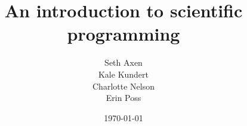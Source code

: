 \documentclass[xcolor=x11names,compress,aspectratio=43]{beamer}
\title[Bootcamp Hacking]{An introduction to scientific programming}
\author[]{Seth Axen\\Kale Kundert\\Charlotte Nelson\\Erin Poss}
\date[]{\today}
\renewcommand{\(}{\begin{columns}}
\renewcommand{\)}{\end{columns}}
\newcommand{\<}[1]{\begin{column}{#1}}
\renewcommand{\>}{\end{column}}
\begin{document}


\begin{frame}
 \titlepage
\end{frame}










\end{document}
